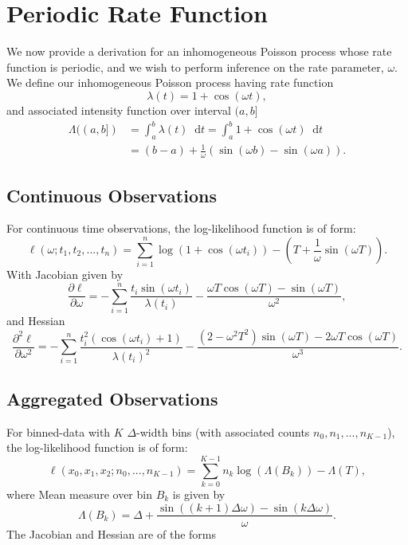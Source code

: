 \documentclass[11pt,a4,twosided,singlespacing,titlepagenumber=on,numbers=endperiod]{scrreprt}
\numberwithin{equation}{chapter} %
\theoremstyle{remark}
\newcommand*{\diff}{\mathop{}\!\mathrm{d}}  %
\begin{document}
\section{Periodic Rate Function}\label{sec:trig_rate}
We now provide a derivation for an inhomogeneous Poisson process whose rate function is periodic, and we wish to perform inference on the rate parameter, $\omega$. We define our inhomogeneous Poisson process having rate function
\begin{equation}\label{eq:trig_rate}
	\lambda(t) = 1 + \cos(\omega t),
\end{equation}
and associated intensity function over interval $(a, b]$
\begin{equation}\label{eq:trig_intensity}
	\begin{aligned}
		\Lambda((a,b]) &= \int_a^b \lambda(t) \diff t = \int_a^b 1 + \cos(\omega t) \diff t \\
		&= (b - a) + \frac{1}{\omega} \left( \sin(\omega b) - \sin(\omega a) \right).
	\end{aligned}
\end{equation}

\subsection{Continuous Observations}
For continuous time observations, the log-likelihood function is of form:
\begin{equation}\label{eq:trig_log_likeli}
	\ell(\omega; t_1, t_2, ..., t_n) = \sum_{i=1}^n \log(1 + \cos(\omega t_i)) - ( T + \frac{1}{\omega} \sin(\omega T)).
\end{equation}
With Jacobian given by
\begin{equation*}
    \frac{\partial \ell}{\partial \omega} = - \sum_{i=1}^n \frac{t_i \sin(\omega t_i)}{\lambda(t_i)} - \frac{\omega T \cos(\omega T) - \sin(\omega T)}{\omega^2},
\end{equation*}
and Hessian
\begin{equation*}
		\frac{\partial^2 \ell}{\partial \omega^2} = -\sum_{i=1}^n \frac{t_i^2 \left(\cos(\omega t_i) + 1 \right)}{\lambda(t_i)^2}
		- \frac{(2 - \omega^2 T^2) \sin(\omega T) - 2 \omega T \cos(\omega T)}{\omega^3}.
\end{equation*}
\subsection{Aggregated Observations}
For binned-data with $K$ $\Delta$-width bins (with associated counts $n_0, n_1, ..., n_{K-1}$), the log-likelihood function is of form:
\begin{equation}\label{eq:trig_loglikeli_binned}
	\ell(x_0, x_1, x_2; n_0, ..., n_{K-1}) = \sum_{k=0}^{K-1} n_k \log( \Lambda(B_k) ) - \Lambda(T),
\end{equation}
where Mean measure over bin $B_k$ is given by 
\begin{equation}
	\Lambda(B_k) = \Delta + \frac{\sin((k+1) \Delta \omega) - \sin(k \Delta \omega)}{\omega}.
\end{equation}
The Jacobian and Hessian are of the forms
\end{document}
